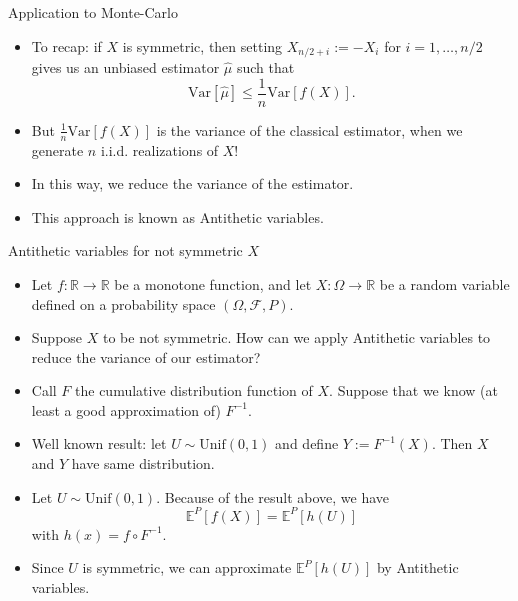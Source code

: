\documentclass[9 pt]{beamer} %
\def \F {\mathcal{F}}
\def \bE {\mathbb{E}}
\begin{document}
\begin{frame}{Application to Monte-Carlo}
\begin{itemize}
\item To recap: if $X$ is symmetric, then setting $X_{n/2+i}:=-X_i$ for  $i=1,\dots,n/2$ gives us an unbiased estimator $\hat \mu$ such that
$$
\text{Var}[\hat \mu] \le \frac{1}{n}\text{Var} [f(X)].
$$
\item But $ \frac{1}{n}\text{Var} [f(X)]$ is the variance of the classical estimator, when we generate $n$ i.i.d. realizations of $X$! 
\item In this way, we reduce the variance of the estimator.
\item This approach is known as Antithetic variables.
\end{itemize}
\end{frame}


\begin{frame}{Antithetic variables for not symmetric $X$}
\begin{itemize}
\item Let $f: \mathbb{R} \to \mathbb{R}$ be a monotone function, and let $X: \Omega \to \mathbb{R}$ be a random variable defined on a probability space $(\Omega, \F, P)$. 
\item Suppose $X$ to be not symmetric. How can we apply Antithetic variables to reduce the variance of our estimator?
\item Call $F$ the cumulative distribution function of $X$. Suppose that we know (at least a good approximation of) $F^{-1}$.
\item Well known result: let $U \sim \text{Unif}(0,1)$ and define $Y:=F^{-1}(X)$. Then $X$ and $Y$ have same distribution.  
\item Let $U \sim \text{Unif}(0,1)$. Because of the result above, we have
$$
\bE^P[f(X)]=\bE^P[h(U)]
$$
with $h(x)=f \circ F^{-1}$.
\item Since $U$ is symmetric, we can approximate $\bE^P[h(U)]$ by Antithetic variables.
\end{itemize}
\end{frame}
\end{document}
